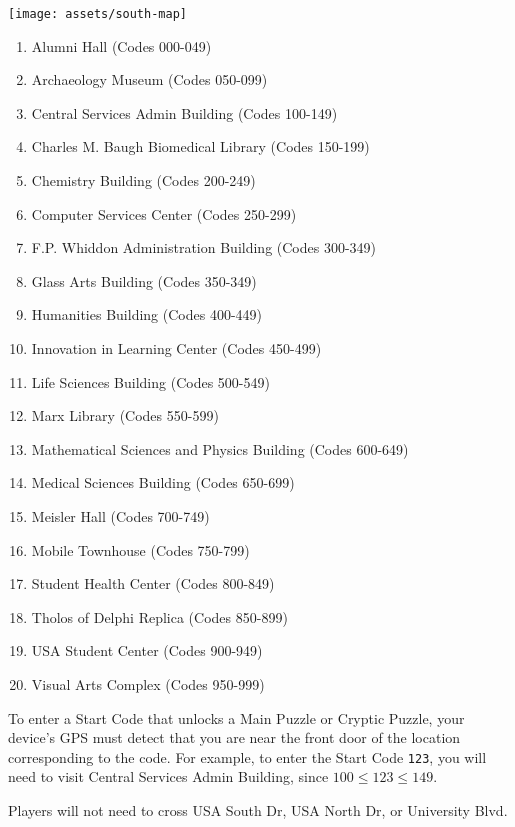 \begin{center}
  \texttt{[image: assets/south-map]}
\end{center}

\begin{multicols}{2}
  \begin{enumerate}
    \item Alumni Hall (Codes 000-049) %
    \item Archaeology Museum (Codes 050-099)
    \item Central Services Admin Building (Codes 100-149) %
    \item Charles M. Baugh Biomedical Library (Codes 150-199) %
    \item Chemistry Building (Codes 200-249) %
    \item Computer Services Center (Codes 250-299)
    \item F.P. Whiddon Administration Building (Codes 300-349) %
    \item Glass Arts Building (Codes 350-349) %
    \item Humanities Building (Codes 400-449) %
    \item Innovation in Learning Center (Codes 450-499)
    \item Life Sciences Building (Codes 500-549)
    \item Marx Library (Codes 550-599) %
    \item Mathematical Sciences and Physics Building (Codes 600-649)
    \item Medical Sciences Building (Codes 650-699)
    \item Meisler Hall (Codes 700-749) %
    \item Mobile Townhouse (Codes 750-799)
    \item Student Health Center (Codes 800-849) %
    \item Tholos of Delphi Replica (Codes 850-899)
    \item USA Student Center (Codes 900-949)
    \item Visual Arts Complex (Codes 950-999) %
  \end{enumerate}
\end{multicols}

To enter a Start Code that unlocks a Main Puzzle or Cryptic Puzzle,
your device's GPS must detect that you are near the front door of 
the location corresponding to the code. 
For example, to enter the Start Code \texttt{123}, you
will need to visit Central Services Admin Building, since
\(100\leq 123\leq 149\).

Players will not need to cross USA South Dr, USA North Dr, or University Blvd.
